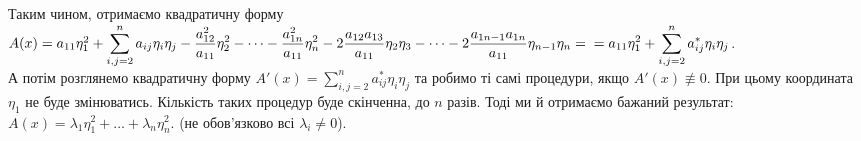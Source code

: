 \documentclass[a4paper, 10pt]{article}
\theoremstyle{theoremdd}
\begin{document}
Таким чином, отримаємо квадратичну форму\\
$A(x) = a_{11}\eta_1^2 + \displaystyle\sum_{i,j=2}^n a_{ij} \eta_i \eta_j - \dfrac{a_{12}^2}{a_{11}} \eta_2^2 - \dots - \dfrac{a_{1n}^2}{a_{11}} \eta_n^2 - 2 \dfrac{a_{12} a_{13}}{a_{11}}\eta_2 \eta_3 - \dots - 2 \dfrac{a_{1 n-1} a_{1n}}{a_{11}} \eta_{n-1}\eta_n = \\ = a_{11}\eta_1^2 + \displaystyle\sum_{i,j=2}^n a_{ij}^* \eta_i \eta_j$.
\bigskip \\
А потім розглянемо квадратичну форму $A'(x) = \displaystyle\sum_{i,j=2}^n a_{ij}^* \eta_i \eta_j$ та робимо ті самі процедури, якщо $A'(x) \not\equiv 0$. При цьому координата $\eta_1$ не буде змінюватись. Кількість таких процедур буде скінченна, до $n$ разів. Тоді ми й отримаємо бажаний результат:\\
$A(x) = \lambda_1 \eta_1^2 + \dots + \lambda_n \eta_n^2$. (не обов'язково всі $\lambda_i \neq 0$).
\end{document}
